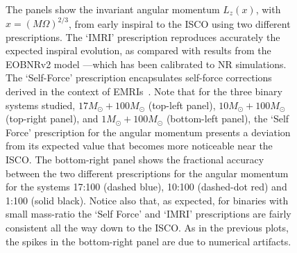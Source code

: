 \begin{figure}[ht]
\caption{The panels show the invariant angular momentum \(L_{z}(x)\), with \(x=\left(M\Omega\right)^{2/3}\), from early inspiral to the ISCO using two different prescriptions. The `IMRI' prescription reproduces accurately the expected inspiral evolution, as compared with results from the EOBNRv2 model ---which has been calibrated to NR simulations. The `Self-Force' prescription encapsulates self-force corrections derived in the context of EMRIs~\cite{sago,barus}. Note that for the three binary systems studied,  \(17M_{\odot} + 100M_{\odot}\) (top-left panel),  \(10M_{\odot} + 100M_{\odot}\) (top-right panel), and  \(1M_{\odot} + 100M_{\odot}\) (bottom-left panel), the `Self Force' prescription for the angular momentum presents a deviation from its expected value that becomes more noticeable near the ISCO. The bottom-right panel shows the fractional accuracy between the two different prescriptions for the angular momentum for the systems 17:100 (dashed blue), 10:100 (dashed-dot red) and 1:100 (solid black). 
Notice also that, as expected, for binaries with small mass-ratio the `Self Force' and `IMRI' prescriptions are fairly consistent all the way down to the ISCO.  As in the previous plots, the spikes in the bottom-right panel are due to numerical artifacts.}
\label{lzfull}
\end{figure}

